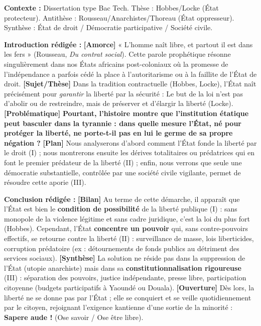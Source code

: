 \documentclass[11pt]{article}
\begin{document}
\begin{exoresolu}
\textbf{Contexte :} Dissertation type Bac Tech. Thèse : Hobbes/Locke (État protecteur). Antithèse : Rousseau/Anarchistes/Thoreau (État oppresseur). Synthèse : État de droit / Démocratie participative / Société civile.

\tcblower
\textbf{Introduction rédigée :}
\og \textbf{[Amorce]} « L'homme naît libre, et partout il est dans les fers » (Rousseau, \emph{Du contrat social}). Cette parole prophétique résonne singulièrement dans nos États africains post-coloniaux où la promesse de l'indépendance a parfois cédé la place à l'autoritarisme ou à la faillite de l'État de droit. \textbf{[Sujet/Thèse]} Dans la tradition contractuelle (Hobbes, Locke), l'État naît précisément pour \emph{garantir} la liberté par la sécurité : \og Le but de la loi n'est pas d'abolir ou de restreindre, mais de préserver et d'élargir la liberté \fg (Locke). \textbf{[Problématique]} \textbf{Pourtant, l'histoire montre que l'institution étatique peut basculer dans la tyrannie : dans quelle mesure l'État, né pour protéger la liberté, ne porte-t-il pas en lui le germe de sa propre négation ?} \textbf{[Plan]} Nous analyserons d'abord comment l'État fonde la liberté par le droit (I) ; nous montrerons ensuite les dérives totalitaires ou prédatrices qui en font le premier prédateur de la liberté (II) ; enfin, nous verrons que seule une démocratie substantielle, contrôlée par une société civile vigilante, permet de résoudre cette aporie (III). \fg

\textbf{Conclusion rédigée :}
\og \textbf{[Bilan]} Au terme de cette démarche, il apparaît que l'État est bien le \textbf{condition de possibilité} de la liberté publique (I) : sans monopole de la violence légitime et sans cadre juridique, c'est la loi du plus fort (Hobbes). Cependant, l'État \textbf{concentre un pouvoir} qui, sans contre-pouvoirs effectifs, se retourne contre la liberté (II) : surveillance de masse, lois liberticides, corruption prédatoire (ex : détournements de fonds publics au détriment des services sociaux). \textbf{[Synthèse]} La solution ne réside pas dans la suppression de l'État (utopie anarchiste) mais dans sa \textbf{constitutionnalisation rigoureuse} (III) : séparation des pouvoirs, justice indépendante, presse libre, participation citoyenne (budgets participatifs à Yaoundé ou Douala). \textbf{[Ouverture]} Dès lors, la liberté ne se \og donne \fg pas par l'État ; elle se \og conquiert \fg et se \og veille \fg quotidiennement par le citoyen, rejoignant l'exigence kantienne d'une \og sortie de la minorité \fg : \og \textbf{Sapere aude !} \fg (Ose savoir / Ose être libre). \fg
\end{exoresolu}
\end{document}
